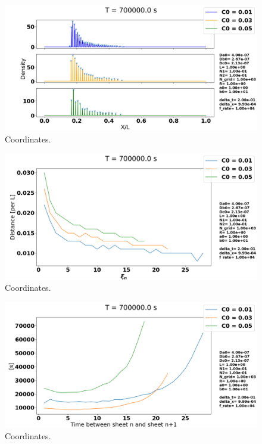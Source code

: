 \documentclass[1p]{elsarticle}        	%
\begin{document}
\begin{figure}
	\centering
	\includegraphics[width=\linewidth]{../figures/deltaC0_s.png}
	\caption{Coordinates.}
	\label{fig:coords}
\end{figure}

\begin{figure}
	\centering
	\includegraphics[width=\linewidth]{../figures/deltaC0_x.png}
	\caption{Coordinates.}
	\label{fig:coords}
\end{figure}

\begin{figure}
	\centering
	\includegraphics[width=\linewidth]{../figures/deltaC0_t.png}
	\caption{Coordinates.}
	\label{fig:coords}
\end{figure}
\end{document}
